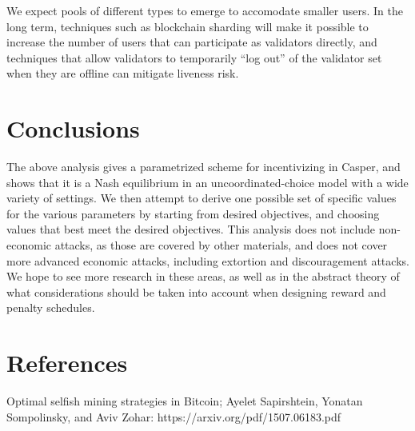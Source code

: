 \documentclass[12pt]{article}
\begin{document}
We expect pools of different types to emerge to accomodate smaller users. In the long term, techniques such as blockchain sharding will make it possible to increase the number of users that can participate as validators directly, and techniques that allow validators to temporarily ``log out'' of the validator set when they are offline can mitigate liveness risk.

\section{Conclusions}

The above analysis gives a parametrized scheme for incentivizing in Casper, and shows that it is a Nash equilibrium in an uncoordinated-choice model with a wide variety of settings. We then attempt to derive one possible set of specific values for the various parameters by starting from desired objectives, and choosing values that best meet the desired objectives. This analysis does not include non-economic attacks, as those are covered by other materials, and does not cover more advanced economic attacks, including extortion and discouragement attacks. We hope to see more research in these areas, as well as in the abstract theory of what considerations should be taken into account when designing reward and penalty schedules.

\section{References}


Optimal selfish mining strategies in Bitcoin; Ayelet Sapirshtein, Yonatan Sompolinsky, and Aviv Zohar: https://arxiv.org/pdf/1507.06183.pdf
\end{document}
